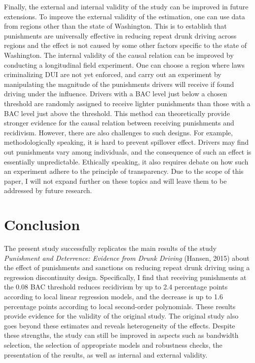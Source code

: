 \documentclass[
  11pt,
]{article}
\begin{document}
Finally, the external and internal validity of the study can be improved
in future extensions. To improve the external validity of the
estimation, one can use data from regions other than the state of
Washington. This is to establish that punishments are universally
effective in reducing repeat drunk driving across regions and the effect
is not caused by some other factors specific to the state of Washington.
The internal validity of the causal relation can be improved by
conducting a longitudinal field experiment. One can choose a region
where laws criminalizing DUI are not yet enforced, and carry out an
experiment by manipulating the magnitude of the punishments drivers will
receive if found driving under the influence. Drivers with a BAC level
just below a chosen threshold are randomly assigned to receive lighter
punishments than those with a BAC level just above the threshold. This
method can theoretically provide stronger evidence for the causal
relation between receiving punishments and recidivism. However, there
are also challenges to such designs. For example, methodologically
speaking, it is hard to prevent spillover effect. Drivers may find out
punishments vary among individuals, and the consequence of such an
effect is essentially unpredictable. Ethically speaking, it also
requires debate on how such an experiment adhere to the principle of
transparency. Due to the scope of this paper, I will not expand further
on these topics and will leave them to be addressed by future research.

\hypertarget{conclusion}{%
\section{Conclusion}\label{conclusion}}

The present study successfully replicates the main results of the study
\emph{Punishment and Deterrence: Evidence from Drunk Driving} (Hansen,
2015) about the effect of punishments and sanctions on reducing repeat
drunk driving using a regression discontinuity design. Specifically, I
find that receiving punishments at the 0.08 BAC threshold reduces
recidivism by up to 2.4 percentage points according to local linear
regression models, and the decrease is up to 1.6 percentage points
according to local second-order polynomials. These results provide
evidence for the validity of the original study. The original study also
goes beyond these estimates and reveals heterogeneity of the effects.
Despite these strengths, the study can still be improved in aspects such
as bandwidth selection, the selection of appropriate models and
robustness checks, the presentation of the results, as well as internal
and external validity.
\end{document}
